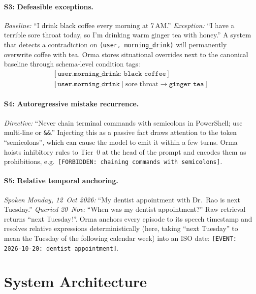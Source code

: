 \documentclass[11pt]{article}
\newcommand{\orma}{\mbox{Orma}}
\begin{document}
\paragraph{S3: Defeasible exceptions.}
\emph{Baseline:} ``I drink black coffee every morning at 7\,AM.'' \emph{Exception:} ``I have a terrible sore throat today, so I'm drinking warm ginger tea with honey.''
A system that detects a contradiction on \texttt{(user, morning\_drink)} will permanently overwrite coffee with tea.
\orma{} stores situational overrides next to the canonical baseline through schema-level condition tags:
\begin{align*}
  &[\texttt{user.morning\_drink: black coffee}]\\
  &[\texttt{user.morning\_drink} \mid \text{sore throat} \rightarrow \texttt{ginger tea}]
\end{align*}

\paragraph{S4: Autoregressive mistake recurrence.}
\emph{Directive:} ``Never chain terminal commands with semicolons in PowerShell; use multi-line or \texttt{\&\&}.''
Injecting this as a passive fact draws attention to the token ``semicolons'', which can cause the model to emit it within a few turns.
\orma{} hoists inhibitory rules to Tier~0 at the head of the prompt and encodes them as prohibitions, e.g.\ \texttt{[FORBIDDEN: chaining commands with semicolons]}.

\paragraph{S5: Relative temporal anchoring.}
\emph{Spoken Monday, 12~Oct 2026:} ``My dentist appointment with Dr.~Rao is next Tuesday.'' \emph{Queried 20~Nov:} ``When was my dentist appointment?''
Raw retrieval returns ``next Tuesday!''.
\orma{} anchors every episode to its speech timestamp and resolves relative expressions deterministically (here, taking ``next Tuesday'' to mean the Tuesday of the following calendar week) into an ISO date: \texttt{[EVENT: 2026-10-20: dentist appointment]}.

\section{System Architecture}
\label{sec:arch}
\end{document}
